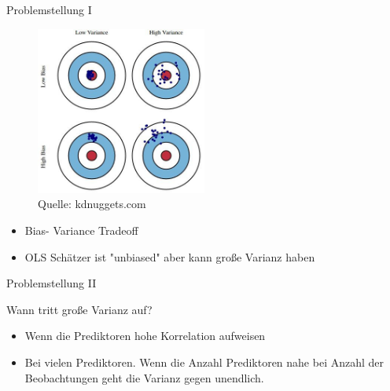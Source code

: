 \documentclass[10pt]{beamer}
\begin{document}
\begin{frame}{Problemstellung I}
        \begin{figure}
            \centering
                \includegraphics[width=0.5\textwidth, keepaspectratio]{figures/bias-and-variance.jpg}
            \caption{Quelle: kdnuggets.com}
         \end{figure}
    
        \begin{itemize}
            \item Bias- Variance Tradeoff
            \item OLS Schätzer ist "unbiased" aber kann große Varianz haben
        \end{itemize}
    
\end{frame}

\begin{frame}{Problemstellung II}
        
        \begin{Large}{Wann tritt große Varianz auf?}\end{Large}
        
        \begin{itemize}
            \item Wenn die Prediktoren hohe Korrelation aufweisen
            \item Bei vielen Prediktoren. Wenn die Anzahl Prediktoren nahe bei Anzahl der Beobachtungen geht die Varianz gegen unendlich.
        \end{itemize}
    
\end{frame}
\end{document}
